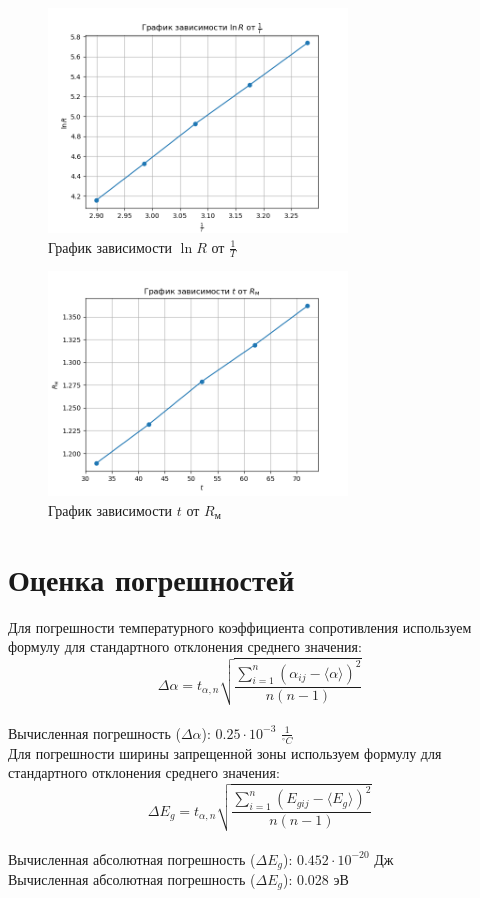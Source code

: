 \documentclass{article}%
\begin{document}
%
\newpage%


\begin{figure}[h!]%
\centering%
\includegraphics[width=300px]{LnR_vs_T.png}%
\caption{График зависимости $\ln{R}$ от $\frac{1}{T}$}%
\end{figure}

%


\begin{figure}[h!]%
\centering%
\includegraphics[width=300px]{kR_vs_t.png}%
\caption{График зависимости $t$ от $R_\text{м}$}%
\end{figure}

%
\section{Оценка погрешностей}%
\label{sec:}%
Для погрешности температурного коэффициента сопротивления используем формулу для стандартного отклонения среднего значения: \[ \Delta \alpha = t_{\alpha, n} \sqrt{\frac{\sum_{i=1}^n (\alpha_{ij} - \langle \alpha \rangle)^2}{n(n-1)}}\]%
\\ Вычисленная погрешность ($\Delta \alpha$): $0.25 \cdot 10^{-3}$ $\frac{1}{^\circ C}$%
\\Для погрешности ширины запрещенной зоны используем формулу для стандартного отклонения среднего значения:\[ \Delta E_g = t_{\alpha, n} \sqrt{\frac{\sum_{i=1}^n (E_{gij} - \langle E_g \rangle)^2}{n(n-1)}}\]%
\\ Вычисленная абсолютная погрешность ($\Delta E_g$): $0.452 \cdot 10^{-20}$ Дж%
\\ Вычисленная абсолютная погрешность ($\Delta E_g$): 0.028 эВ
\end{document}
